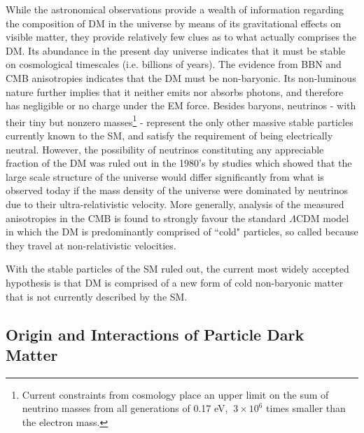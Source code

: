 While the astronomical observations provide a wealth of information regarding the composition of DM in the universe by means of its gravitational effects on visible matter, they provide relatively few clues as to what actually comprises the DM. Its abundance in the present day universe indicates that it must be stable on cosmological timescales (i.e. billions of years). The evidence from BBN and CMB anisotropies indicates that the DM must be non-baryonic. Its non-luminous nature further implies that it neither emits nor absorbs photons, and therefore has negligible or no charge under the EM force. Besides baryons, neutrinos - with their tiny but nonzero masses\footnote{Current constraints from cosmology place an upper limit on the sum of neutrino masses from all generations of 0.17 eV, \(~3\times10^6\) times smaller than the electron mass.} - represent the only other massive stable particles currently known to the SM, and satisfy the requirement of being electrically neutral. However, the possibility of neutrinos constituting any appreciable fraction of the DM was ruled out in the 1980's by studies \cite{neutrino_dm} which showed that the large scale structure of the universe would differ significantly from what is observed today if the mass density of the universe were dominated by neutrinos due to their ultra-relativistic velocity. More generally, analysis of the measured anisotropies in the CMB \cite{Planck_2020} is found to strongly favour the standard \(\Lambda\)CDM model in which the DM is predominantly comprised of ``cold" particles, so called because they travel at non-relativistic velocities.

With the stable particles of the SM ruled out, the current most widely accepted hypothesis is that DM is comprised of a new form of cold non-baryonic matter that is not currently described by the SM.

\subsection{Origin and Interactions of Particle Dark Matter}
\label{sec:dm_origins}

